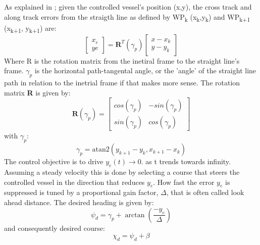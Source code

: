 As explained in \cite{lekkas2013line}; given the controlled vessel's position (x,y), the cross track and along track errors from the straigth line as defined by WP\textsubscript{k} (x\textsubscript{k},y\textsubscript{k})
and WP\textsubscript{k+1} (x\textsubscript{k+1}, y\textsubscript{k+1}) are:
\begin{equation} %
    \begin{bmatrix}
        x_e \\[-5pt]
         ye
    \end{bmatrix} = \textbf{R}^T(\gamma_p) \begin{bmatrix}
                                            x - x_k \\[-5pt]
                                            y - y_k
                                            \end{bmatrix}
\end{equation}
Where R is the rotation matrix from the inetiral frame to the straight line's frame. $\gamma_p$ is the horizontal path-tangental angle,
or the 'angle' of the straight line path in relation to the inetrial frame if that makes more sense. The rotation matrix \textbf{R} is given by:
\begin{equation} %
    \textbf{R}(\gamma_p) = \begin{bmatrix}
                            cos(\gamma_p) & -sin(\gamma_p) \\[-5pt]
                            sin(\gamma_p) & cos(\gamma_p)
                            \end{bmatrix}
\end{equation}
with $\gamma_p$:
\begin{equation} %
    \gamma_p = \textrm{atan2}(y_{k+1} - y_k , x_{k+1} - x_k)
\end{equation}
The control objective is to drive $y_{e}(t) \rightarrow 0.$ as t trends towards infinity. Assuming a steady velocity this is done by
selecting a course that steers the controlled vessel in the direction that reduces $y_e$. How fast the error $y_e$ is suppressed is
tuned by a proportional gain factor, $\varDelta$, that is often called look ahead distance. The desired heading is given by:
\begin{equation} %
    \psi_d = \gamma_p + \arctan(\frac{-y_e}{\varDelta})
\end{equation}
and consequently desired course:
\begin{equation}
    \chi_d = \psi_d + \beta
\end{equation}
